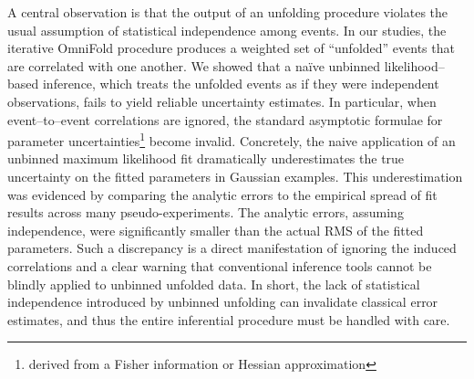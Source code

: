     A central observation is that the output of an unfolding procedure violates the usual assumption of statistical independence among events.
    In our studies, the iterative OmniFold procedure produces a weighted set of “unfolded” events that are correlated with one another.
    We showed that a naïve unbinned likelihood--based inference, which treats the unfolded events as if they were independent observations, fails to yield reliable uncertainty estimates.
    In particular, when event--to--event correlations are ignored, the standard asymptotic formulae for parameter uncertainties\footnote{derived from a Fisher information or Hessian approximation} become invalid.
    Concretely, the naive application of an unbinned maximum likelihood fit dramatically underestimates the true uncertainty on the fitted parameters in Gaussian examples.
    This underestimation was evidenced by comparing the analytic errors to the empirical spread of fit results across many pseudo-experiments.
    The analytic errors, assuming independence, were significantly smaller than the actual RMS of the fitted parameters.
    Such a discrepancy is a direct manifestation of ignoring the induced correlations and a clear warning that conventional inference tools cannot be blindly applied to unbinned unfolded data.
    In short, the lack of statistical independence introduced by unbinned unfolding can invalidate classical error estimates, and thus the entire inferential procedure must be handled with care.

